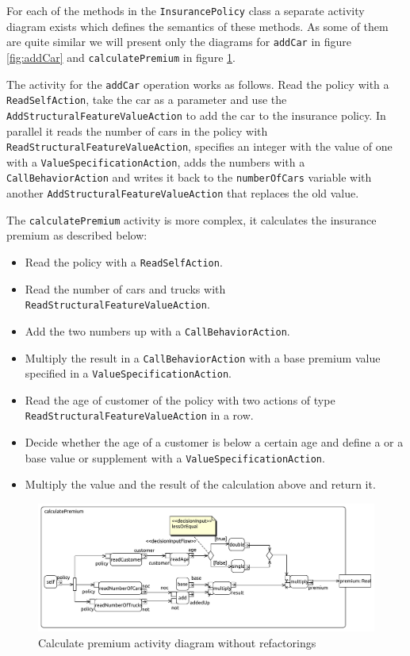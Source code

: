 \documentclass{llncs}
\begin{document}
For each of the methods in the \lstinline|InsurancePolicy| class a separate activity diagram exists which defines the semantics 
of these methods. As some of them are quite similar we will present only the diagrams for \lstinline|addCar| in figure 
\ref{fig:addCar} and \lstinline|calculatePremium| in  figure \ref{fig:calculatePremium}.

The activity for the \lstinline|addCar| operation works as follows. Read the policy with a \lstinline|ReadSelfAction|, take the 
car as a parameter and use the \lstinline|AddStructuralFeatureValueAction| to add the car to the insurance policy. In parallel 
it reads the number of cars in the policy with \lstinline|ReadStructuralFeatureValueAction|, specifies an integer
with the value of one with 
a \lstinline|ValueSpecificationAction|, adds the numbers with a \lstinline|CallBehaviorAction| and writes it back to the 
\lstinline|numberOfCars| variable with another \lstinline|AddStructuralFeatureValueAction| that replaces the old value.

The \lstinline|calculatePremium| activity is more complex, it calculates the insurance premium as described below:

\begin{itemize}
 \item Read the policy with a \lstinline|ReadSelfAction|.
 \item Read the number of cars and trucks with \lstinline|ReadStructuralFeatureValueAction|.
 \item Add the two numbers up with a \lstinline|CallBehaviorAction|.
 \item Multiply the result in a \lstinline|CallBehaviorAction| with a base premium value specified in a \lstinline|ValueSpecificationAction|.
 \item Read the age of customer of the policy with two actions of type \lstinline|ReadStructuralFeatureValueAction| in a row.
 \item Decide whether the age of a customer is below a certain age and define a or a base value or supplement with a \lstinline|ValueSpecificationAction|.
 \item Multiply the value and the result of the calculation above and return it.
\end{itemize}

\begin{figure}[h!t]
 \centering
 \includegraphics[scale=0.5]{images/insurance/Activity_calculatePremium_calculatePremium}
 \caption{Calculate premium activity diagram without refactorings}
 \label{fig:calculatePremium}
\end{figure}
\end{document}
